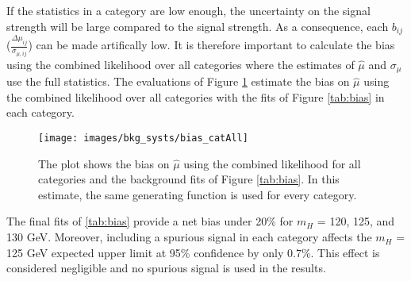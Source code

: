 If the statistics in a category are low enough, the uncertainty on the signal strength will be large compared to the signal strength. As a consequence, each $b_{ij}$ ($\frac{\Delta\mu_{ij}}{\sigma_{\mu,ij}}$) can be made artifically low. It is therefore important to calculate the bias using the combined likelihood over all categories where the estimates of $\hat{\mu}$ and $\sigma_\mu$ use the full statistics. The evaluations of Figure \ref{fig:bias_correlation} estimate the bias on $\hat{\mu}$ using the combined likelihood over all categories with the fits of Figure \ref{tab:bias} in each category.  
\begin{figure}[h!]
    \centering
    \texttt{[image: images/bkg\_systs/bias\_catAll]}
    \caption[The net bias of the combined background model.]
    {The plot shows the bias on $\hat{\mu}$ using the combined likelihood for all categories and the background fits of Figure \ref{tab:bias}. In this estimate, the same generating function is used for every category.}
    \label{fig:bias_correlation}
\end{figure}
The final fits of \ref{tab:bias} provide a net bias under 20\% for $m_H$ = 120, 125, and 130 GeV. Moreover, including a spurious signal in each category affects the $m_H$ = 125 GeV expected upper limit at 95\% confidence by only 0.7\%. This effect is considered negligible and no spurious signal is used in the results. 
